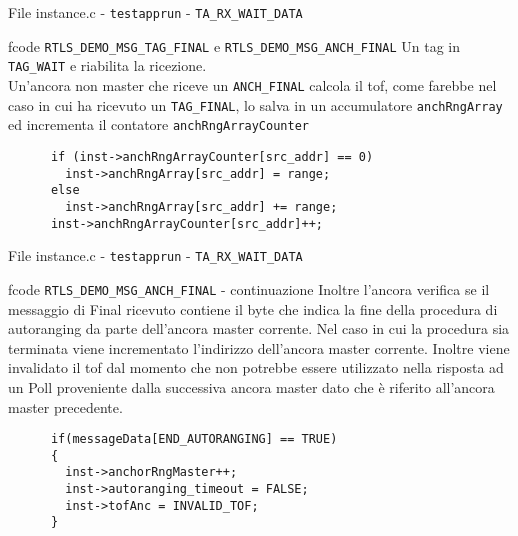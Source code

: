 \begin{frame}[fragile]{File instance.c - \lstinline!testapprun! - \lstinline!TA_RX_WAIT_DATA!}
  \begin{block}{fcode \lstinline!RTLS_DEMO_MSG_TAG_FINAL! e \lstinline!RTLS_DEMO_MSG_ANCH_FINAL!}
    Un tag in \lstinline!TAG_WAIT! e riabilita la ricezione.\\
    Un'ancora non master che riceve un \lstinline!ANCH_FINAL! calcola il tof, come
    farebbe nel caso in cui ha ricevuto un \lstinline!TAG_FINAL!, lo salva in un accumulatore
    \lstinline!anchRngArray! ed incrementa il contatore \lstinline!anchRngArrayCounter!
    \begin{lstlisting}
      if (inst->anchRngArrayCounter[src_addr] == 0)
        inst->anchRngArray[src_addr] = range;
      else 
        inst->anchRngArray[src_addr] += range;
      inst->anchRngArrayCounter[src_addr]++;
    \end{lstlisting}
  \end{block}
\end{frame}

\begin{frame}[fragile]{File instance.c - \lstinline!testapprun! - \lstinline!TA_RX_WAIT_DATA!}
  \begin{block}{fcode \lstinline!RTLS_DEMO_MSG_ANCH_FINAL! - continuazione}
    Inoltre l'ancora verifica se il messaggio di Final ricevuto contiene
    il byte che indica la fine della procedura di autoranging da parte dell'ancora
    master corrente. Nel caso in cui la procedura sia terminata viene incrementato
    l'indirizzo dell'ancora master corrente. Inoltre \alert{viene invalidato} il tof
    dal momento che non potrebbe essere utilizzato nella risposta ad un Poll proveniente
    dalla successiva ancora master dato che è riferito all'ancora master precedente.
    \begin{lstlisting}
      if(messageData[END_AUTORANGING] == TRUE)
      {
        inst->anchorRngMaster++;
        inst->autoranging_timeout = FALSE;
        inst->tofAnc = INVALID_TOF;
      }
    \end{lstlisting}
  \end{block}
\end{frame}

